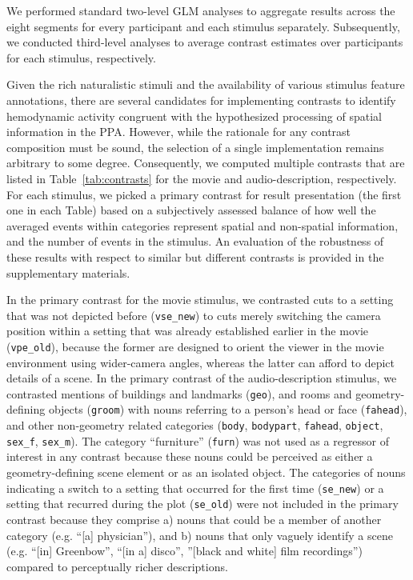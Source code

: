 \documentclass[english]{article}
\begin{document}
We performed standard two-level GLM analyses to aggregate results across the
eight segments for every participant and each stimulus separately.
Subsequently, we conducted third-level analyses to average contrast estimates
over participants for each stimulus, respectively.

Given the rich naturalistic stimuli and the availability of various stimulus
feature annotations, there are several candidates for implementing contrasts to
identify hemodynamic activity congruent with the hypothesized processing of
spatial information in the PPA.
However, while the rationale for any contrast composition must be sound, the
selection of a single implementation remains arbitrary to some degree.
Consequently, we computed multiple contrasts that are listed in
Table~\ref{tab:contrasts} for the movie and audio-description, respectively.
For each stimulus, we picked a primary contrast for result presentation (the
first one in each Table) based on a subjectively assessed balance of how well
the averaged events within categories represent spatial and non-spatial
information, and the number of events in the stimulus.
An evaluation of the robustness of these results with respect to similar but
different contrasts is provided in the supplementary materials.

In the primary contrast for the movie stimulus, we contrasted cuts to a setting
that was not depicted before (\texttt{vse\_new}) to cuts merely switching the
camera position within a setting that was already established earlier in the
movie (\texttt{vpe\_old}), because the former are designed to orient the viewer
in the movie environment using wider-camera angles, whereas the latter can
afford to depict details of a scene.
In the primary contrast of the audio-description stimulus, we contrasted
mentions of buildings and landmarks (\texttt{geo}), and rooms and
geometry-defining objects (\texttt{groom}) with nouns referring to a person's
head or face (\texttt{fahead}), and other non-geometry related categories
(\texttt{body}, \texttt{bodypart}, \texttt{fahead}, \texttt{object},
\texttt{sex\_f}, \texttt{sex\_m}).
The category ``furniture'' (\texttt{furn}) was not used as a regressor of
interest in any contrast because these nouns could be perceived as either a
geometry-defining scene element or as an isolated object.
The categories of nouns indicating a switch to a setting that occurred for the
first time (\texttt{se\_new}) or a setting that recurred during the plot
(\texttt{se\_old}) were not included in the primary contrast because they
comprise
a)  nouns that could be a member of another category (e.g. ``[a]
physician''), and
b) nouns that only vaguely identify a scene (e.g. ``[in] Greenbow'', ``[in a]
disco'', ''[black and white] film recordings'') compared to perceptually richer
descriptions.
\end{document}

